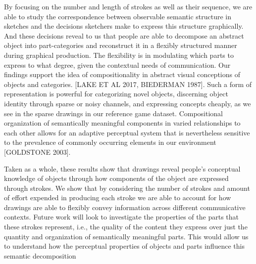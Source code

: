 \documentclass[10pt,letterpaper]{article}
\newcommand{\kushin}[1]{{\color{orange}{[kushin: #1]}}}
\begin{document}
By focusing on the number and length of strokes as well as their sequence, we are able to study the correspondence between observable semantic structure in sketches and the decisions sketchers make to express this structure graphically.
And these decisions reveal to us that people are able to decompose an abstract object into part-categories and reconstruct it in a flexibly structured manner during graphical production. The flexibility is in modulating which parts to express to what degree, given the contextual needs of communication.
Our findings support the idea of compositionality in abstract visual conceptions of objects and categories. [LAKE ET AL 2017, BIEDERMAN 1987]. 
Such a form of representation is powerful for categorizing novel objects, discerning object identity through sparse or noisy channels, \kushin{too vague maybe?} and expressing concepts cheaply, as we see in the sparse drawings in our reference game dataset. 
Compositional organization of semantically meaningful components in varied relationships to each other allows for an adaptive perceptual system that is nevertheless sensitive to the prevalence of commonly occurring elements in our environment [GOLDSTONE 2003]. 

Taken as a whole, these results show that drawings reveal people's conceptual knowledge of objects through how components of the object are expressed through strokes. We show that by considering the number of strokes and amount of effort expended in producing each stroke we are able to account for how drawings are able to flexibly convey information across different communicative contexts. Future work will look to investigate the properties of the parts that these strokes represent, i.e., the quality of the content they express over just the quantity and organization of semantically meaningful parts. This would allow us to understand how the perceptual properties of objects and parts influence this semantic decomposition

\kushin{need to tighten this paragraph to have a narrative throughline}

\end{document}
